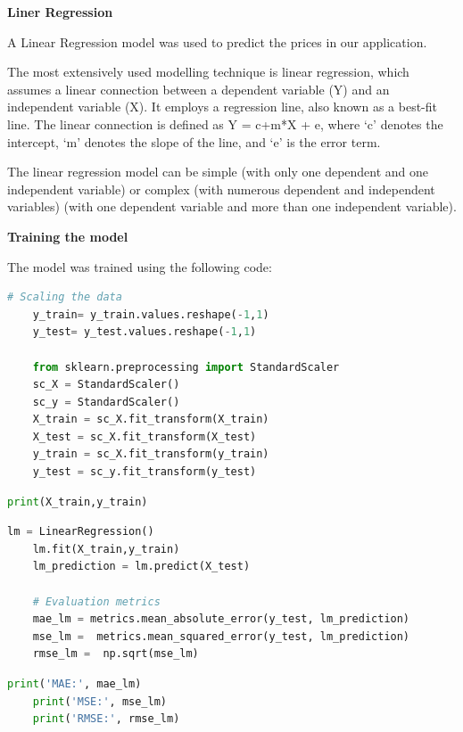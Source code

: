\noindent\textbf{Liner Regression}\par
\noindent\medskip
A Linear Regression model was used to predict the prices in our application.\par
\medskip
The most extensively used modelling technique is linear regression, which assumes a linear connection between a dependent variable (Y) and an independent variable (X). It employs a regression line, also known as a best-fit line. The linear connection is defined as Y = c+m*X + e, where ‘c’ denotes the intercept, ‘m’ denotes the slope of the line, and ‘e’ is the error term.\par
\medskip
The linear regression model can be simple (with only one dependent and one independent variable) or complex (with numerous dependent and independent variables) (with one dependent variable and more than one independent variable).

\medskip
\noindent\textbf{Training the model}\par\medskip
\noindent\medskip
The model was trained using the following code:

\begin{lstlisting}[language=python]
    # Scaling the data
    y_train= y_train.values.reshape(-1,1)
    y_test= y_test.values.reshape(-1,1)
    
    from sklearn.preprocessing import StandardScaler
    sc_X = StandardScaler()
    sc_y = StandardScaler()
    X_train = sc_X.fit_transform(X_train)
    X_test = sc_X.fit_transform(X_test)
    y_train = sc_X.fit_transform(y_train)
    y_test = sc_y.fit_transform(y_test)
\end{lstlisting}

\begin{lstlisting}[language=python]
    print(X_train,y_train)
\end{lstlisting}

\begin{lstlisting}[language=python]
    lm = LinearRegression()
    lm.fit(X_train,y_train)
    lm_prediction = lm.predict(X_test)
    
    # Evaluation metrics
    mae_lm = metrics.mean_absolute_error(y_test, lm_prediction)
    mse_lm =  metrics.mean_squared_error(y_test, lm_prediction)
    rmse_lm =  np.sqrt(mse_lm)
\end{lstlisting}

\begin{lstlisting}[language=python]
    print('MAE:', mae_lm)
    print('MSE:', mse_lm)
    print('RMSE:', rmse_lm)
\end{lstlisting}

